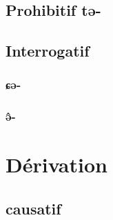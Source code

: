 \documentclass[11pt, a4paper]{book}              %
\newcommand{\ipa}[1]{{\phon \mbox{#1}}} %
\begin{document}
\section{Prohibitif \ipa{tə-}}
\section{Interrogatif}
\subsection{\ipa{ɕə-}}
\subsection{\ipa{ə̂-}}


\chapter{Dérivation}

\section{causatif}
\end{document}
